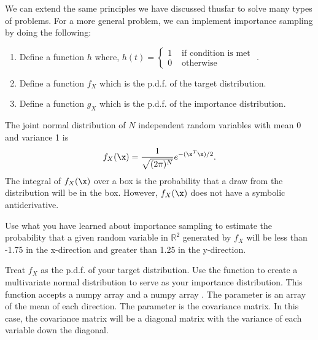 We can extend the same principles we have discussed thusfar to solve many types of problems. For a more general problem, we can implement importance sampling by doing the following:
\begin{enumerate}
\item Define a function $h$ where, $h(t) = \begin{cases}
1 & \text{ if condition is met }  \\ 
0 & \text{ otherwise}
\end{cases} $.  
\item Define a function $f_X$ which is the p.d.f. of the target distribution. 
\item Define a function $g_X$ which is the p.d.f. of the importance distribution.
\end{enumerate}

\begin{problem}
The joint normal distribution of $N$ independent random variables with mean 0 and variance 1 is
\[
f_X(\x) = \frac{1}{\sqrt{(2 \pi)^N}} e^{-(\x^T\x)/2}.
\]
The integral of $f_X(\x)$ over a box is the probability that a draw from the distribution will be in the box.
However, $f_X(\x)$ does not have a symbolic antiderivative.

Use what you have learned about importance sampling to estimate the probability that a given random variable in $\mathbb{R}^2$ generated by $f_X$ will be less than -1.75 in the x-direction and greater than 1.25 in the y-direction.

Treat $f_X$ as the p.d.f. of your target distribution.
Use the function  to create a multivariate normal distribution to serve as your importance distribution. 
This function accepts a numpy array  and a numpy array . 
The parameter  is an array of the mean of each direction. 
The parameter  is the covariance matrix. 
In this case, the covariance matrix will be a diagonal matrix with the variance of each variable down the diagonal. 

\end{problem}

